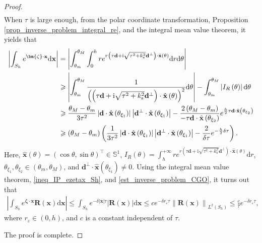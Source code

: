\documentclass[11pt,reqno,oneside]{amsart}
\theoremstyle{definition}
\theoremstyle{remark}
\numberwithin{equation}{section}
\numberwithin{equation}{section}
\theoremstyle{remark}
\begin{document}
\begin{proof}
\begin{align*}
	\end{align*}
	When $ \tau $ is large enough, from the polar coordinate transformation, Proposition \ref{prop_inverse_problem_integral_re}, and the integral mean value theorem, it yields that
	\begin{align*} 
		\left|\int_{S_h} e^{\bm{\zeta} \cdot \mathbf{x}} \mathrm{d}\mathbf{x}\right| & = \left| \int_{\theta_m}^{\theta_M} \int_0^h r e^{r \left( \tau \mathbf{d} + \text{i} \sqrt{\tau^2 + k_{\mathrm{s}}^2} \mathbf{d}^{\perp} \right) \cdot \hat{\mathbf{x}}\left(\theta\right)} \mathrm{d}r \mathrm{d}\theta\right| \notag \\
		& \geqslant \left| \int_{\theta_m}^{\theta_M}  \frac{1}{\left( \left( \tau \mathbf{d} + \text{i} \sqrt{\tau^2+k_{\mathrm{s}}^2} \mathbf{d}^{\perp} \right) \cdot \hat{\mathbf{x}}\left(\theta\right) \right)^2} \mathrm{d}\theta\right| - \int_{\theta_m}^{\theta_M} \left| I_R\left(\theta\right)\right| \mathrm{d}\theta \notag \\
		& \geqslant \frac{\theta_M-\theta_m}{3\tau^2} \left|\mathbf{d}\cdot\hat{\mathbf{x}} \left(\theta_{\xi_1}\right)\right| \left|\mathbf{d}^{\perp}\cdot\hat{\mathbf{x}} \left(\theta_{\xi_1}\right)\right| - \frac{2\left(\theta_M-\theta_m\right)}{- \tau \mathbf{d} \cdot \hat{\mathbf{x}} \left(\theta_{\xi_2}\right)} e^{\frac{h}{2} \tau \mathbf{d} \cdot \hat{\mathbf{x}} \left(\theta_{\xi_2}\right)} \notag \\
		& \geqslant \left(\theta_M-\theta_m\right)\left(\frac{1}{3 \tau^2}\left|\mathbf{d}\cdot\hat{\mathbf{x}} \left(\theta_{\xi_1}\right)\right| \left|\mathbf{d}^{\perp}\cdot\hat{\mathbf{x}} \left(\theta_{\xi_1}\right)\right| - \frac{2}{\delta\tau} e^{-\frac{h}{2} \delta \tau}\right).
	\end{align*}
	Here, $ \hat{\mathbf{x}} \left(\theta\right) = \left(\cos \theta, \sin \theta\right)^{\top}\in \mathbb{S}^1 $, $ I_R \left(\theta\right) = \int_h^{+ \infty} r e^{r \left( \tau \mathbf{d} + \text{i} \sqrt{\tau^2 + k_{\mathrm{s}}^2} \mathbf{d}^{\perp} \right) \cdot \hat{\mathbf{x}} \left(\theta\right)} \mathrm{d}r $, $ \theta_{\xi_1}, \theta_{\xi_2} \in \left(\theta_m, \theta_M\right) $, and $ \mathbf{d}^{\perp}\cdot\hat{\mathbf{x}} \left(\theta_{\xi_1}\right) \neq 0 $. Using the integral mean value theorem, \eqref{ineq_IP_ezetax_Sh}, and \eqref{est_inverse_problem_CGO}, it turns out that
	\begin{align*} 
		\left|\int_{S_h} e^{\bm{\zeta} \cdot \mathbf{x}} \mathbf{R}\left(\mathbf{x}\right) \mathrm{d}\mathbf{x} \right| \leqslant \int_{S_h} e^{-\delta \left|\mathbf{x}\right| \tau} \left|\mathbf{R}\left(\mathbf{x}\right)\right| \mathrm{d}\mathbf{x} \leqslant c e^{-\delta r_{\varepsilon} \tau} \left\| \mathbf{R}\left(\mathbf{x}\right) \right\|_{L^2\left(S_h\right)} \leqslant \frac{c}{\tau} e^{-\delta r_{\varepsilon} \tau} ,
	\end{align*}
	where $ r_{\varepsilon}\in\left(0,h\right) $, and $ c $ is a constant independent of $ \tau $. 
	
	The proof is complete. 
\end{proof}
\end{document}
